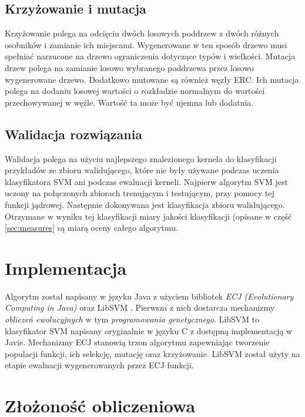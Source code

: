\subsection{Krzyżowanie i mutacja}
Krzyżowanie polega na odcięciu dwóch losowych poddrzew z dwóch różnych osobników i zamianie ich miejscami. Wygenerowane w ten sposób drzewo musi spełniać narzucone na drzewo ograniczenia dotyczące typów i wielkości.
Mutacja drzew polega na zamianie losowo wybranego poddrzewa przez losowo wygenerowane drzewo.
Dodatkowo mutowane są również węzły ERC. Ich mutacja polega na dodaniu losowej wartości o rozkładzie normalnym do wartości przechowywanej w węźle. Wartość ta może być ujemna lub dodatnia.

\subsection{Walidacja rozwiązania}
Walidacja polega na użyciu najlepszego znalezionego kernela do klasyfikacji przykładów ze zbioru walidującego, które nie były używane podczas uczenia klasyfikatora SVM ani podczas ewaluacji kerneli.
Najpierw algorytm SVM jest uczony na połączonych zbiorach trenującym i testującym, przy pomocy tej funkcji jądrowej. Następnie dokonywana jest klasyfikacja zbioru walidującego. Otrzymane w wyniku tej klasyfikacji miary jakości klasyfikacji (opisane w część \ref{sec:measures} są miarą oceny całego algorytmu.

\section{Implementacja}
Algorytm został napisany w języku Java z użyciem bibliotek \textit{ECJ (Evolutionary Computing in Java)} \cite{sean_ecj_2010} oraz LibSVM \cite{chang_libsvm:_2011}. Pierwsza z nich dostarcza mechanizmy \textit{obliczeń ewolucyjnych} w tym \textit{programowania genetycznego}.
LibSVM to klasyfikator SVM napisany oryginalnie w języku C z dostępną implementacją w Javie.
Mechanizmy ECJ stanowią trzon algorytmu zapewniając tworzenie populacji funkcji, ich selekcję, mutację oraz krzyżowanie. LibSVM został użyty na etapie ewaluacji wygenerowanych przez ECJ funkcji. 


\section{Złożoność obliczeniowa}
 \clearpage